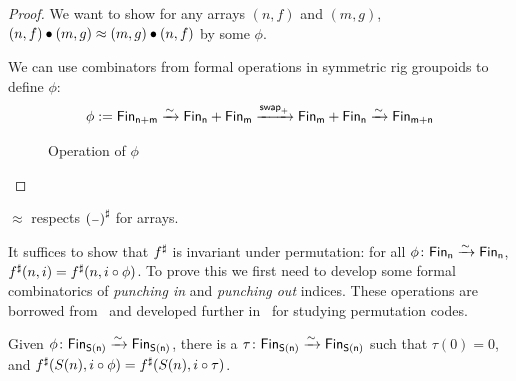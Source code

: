\begin{proof}
    We want to show for any arrays $(n, f)$ and $(m, g)$, $(n, f) \mathbin{\bullet} (m, g) \approx (m, g) \mathbin{\bullet} (n, f)$
    by some $\phi$.

    We can use combinators from formal operations in symmetric rig groupoids \cite{choudhurySymmetriesReversibleProgramming2022} to define $\phi$:
    \begin{align*}
        \phi := \Fin[n+m] \xto{\sim} \Fin[n] + \Fin[m] \xto{\term{swap}_{+}} \Fin[m] + \Fin[n] \xto{\sim} \Fin[m+n] \\
    \end{align*}

    \begin{figure}[H]
        \centering
        \caption{Operation of $\phi$}
        \label{fig:enter-label}
    \end{figure}

\end{proof}

\begin{proposition}
    $\approx$ respects ${({\scriptstyle{-}})}^{\sharp}$ for arrays.
\end{proposition}

It suffices to show that ${f}^{\sharp}$ is invariant under permutation: for all $\phi\colon \Fin[n]\xto{\sim}\Fin[n]$,
$\ext{f}(n, i) \id \ext{f}(n, i \circ \phi)$. To prove this we first need to develop some formal combinatorics of
\emph{punching in} and \emph{punching out} indices. These operations are
borrowed from~\cite{mozlerCubicalAgdaSimple2021} and
developed further
in~\cite{choudhurySymmetriesReversibleProgramming2022} for studying permutation codes.

\begin{lemma}\label{bag:tau}
    Given $\phi\colon \Fin[S(n)]\xto{\sim}\Fin[S(n)]$, there is a $\tau\colon \Fin[S(n)]\xto{\sim}\Fin[S(n)]$
    such that $\tau(0) = 0$, and ${f}^{\sharp}(S(n), i \circ \phi) = {f}^{\sharp}(S(n), i \circ \tau)$.
\end{lemma}

